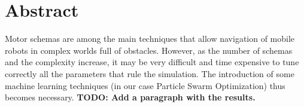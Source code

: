 \documentclass[journal]{IEEEtran}
\begin{document}







\maketitle


%






%
\IEEEpeerreviewmaketitle

\section*{Abstract}
Motor schemas are among the main techniques that allow navigation
of mobile robots in complex worlds full of obstacles. However,
as the number of schemas and the complexity increase, it may be very
difficult and time expensive to tune correctly all the parameters that
rule the simulation. The introduction of some machine learning
techniques (in our case Particle Swarm Optimization) thus becomes necessary. 
\textbf{TODO: Add a paragraph with the results.}
\end{document}
